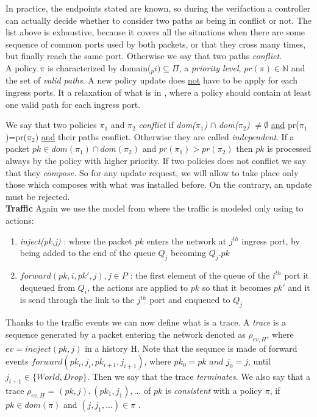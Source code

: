 \documentclass{article}
\theoremstyle{remark}
\begin{document}
    In practice, the endpoints stated are known, so during the verifaction a controller can actually decide whether to consider two paths as being in conflict or not.
    The list above is exhaustive, because it covers all the situations when there are some sequence of common ports used by both packets, or that they cross many times, but finally reach the same port. Otherwise we say that two paths \emph{conflict}.\\
    A policy $\pi$ is characterized by domain($_pi)\subseteq\Pi$, a \emph{priority level}, $pr(\pi)\in\mathbb{N}$ and the set of \emph{valid paths}. A new policy update does \underline{not} have to be apply for each ingress ports. It a relaxation of what is in \cite{CKLS15}, where a policy should contain at least one valid path for each ingress port.
    
We say that two policies $\pi_1$ and $\pi_2$ \emph{conflict} if \emph{dom($\pi_1$)} $\cap$ \emph{dom($\pi_2$)} $\neq \emptyset$ \underline{and} pr($\pi_1$)=pr($\pi_2$) \underline{and} their paths conflict. Otherwise they are called \emph{independent}.
If a packet $pk\in dom(\pi_1) \cap dom(\pi_2)$ and $pr(\pi_1)>pr(\pi_2)$ then $pk$ is processed always by the policy with higher priority. 
If two policies does not conflict we say that they \emph{compose.} So for any update request, we will allow to take place only those which composes with what was installed before. On the contrary, an update must be rejected.  \\
\textbf{Traffic} Again we use the model from \cite{CKLS15} where the traffic is modeled only using to actions:
\begin{enumerate}
\item \emph{inject(pk,j)} : where the packet $pk$ enters the network at $j^{th}$ ingress port, by being added to the end of the queue $Q_j$ becoming $Q_j.pk$
\item $forward(pk,i,pk',j), j\in P$ : the first element of the queue of the $i^{th}$ port it dequeued from $Q_i$, the actions are applied to $pk$ so that it becomes $pk'$ and it is send through the link to the $j^{th}$ port and enqueued to $Q_j$
\end{enumerate}
Thanks to the traffic events we can now define what is a trace. A \emph{trace} is a sequence generated by a packet entering the network denoted as $\rho_{ev,H}$, where $ev = incject(pk,j)$ in a history H. Note that the sequnce is made of forward events $forward(pk_i,j_i,pk_{i+1},j_{i+1})$, where $pk_0=pk \textit{ and } j_0=j$, until $j_{i+1} \in\lbrace World, Drop \rbrace$. Then we say that the trace \emph{terminates}.
We also say that a trace $\rho_{ev,H}$ = $(pk,j),(pk_1,j_1),...$ of $pk$ is \emph{consistent} with a policy $\pi$, if $pk\in dom(\pi)$ and $(j,j_1,...)\in \pi$ \cite{CKLS15}.
\end{document}
